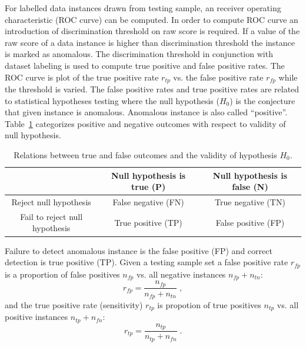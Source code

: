 For labelled data instances drawn from testing sample, an receiver operating characteristic 
(ROC curve) can be computed. 
In order to compute ROC curve an introduction of discrimination threshold on raw score 
is required. If a value of the raw score of a data instance is higher than discrimination 
threshold the instance is marked as anomalous. The discrimination threshold in conjunction 
with dataset labeling is used to compute true positive and false positive rates.
The ROC curve is plot of the true positive rate $r_{tp}$ vs. the false positive rate $r_{fp}$ 
while the threshold is varied.
The false positive rates and true positive rates are related to statistical hypotheses testing
where the null hypothesis ($H_0$) is the conjecture that given instance is anomalous.
Anomalous instance is also called ``positive''. Table~\ref{tbl:hypo} categorizes positive and
negative outcomes  with respect to validity of null hypothesis.

\begin{table}[h]
    \begin{center}
        \begin{tabular}{c|cc}
        	& Null hypothesis is true (P)	& Null hypothesis is false (N) \\ \hline
        	Reject null hypothesis & False negative (FN) & True negative (TN) \\
        	Fail to reject null hypothesis & True positive (TP) & False positive (FP) \\ %
        \end{tabular}
    \end{center}
    \caption{\small Relations between true and false outcomes and the validity of hypothesis $H_0$.}
    \label{tbl:hypo}
\end{table}



Failure to detect anomalous instance is the false positive (FP) and correct detection is true positive (TP).
Given a testing sample set a false positive rate $r_{fp}$ is a proportion of false positives $n_{fp}$ vs.
all negative instances $n_{fp} + n_{tn}$:
\begin{equation}
	r_{fp} = \frac{n_{fp}}{n_{fp}+n_{tn}} \;,
\end{equation}
and the true positive rate (sensitivity) $r_{tp}$ is propotion of true positives $n_{tp}$ 
vs. all positive instances $n_{tp} + n_{fn}$:
\begin{equation}
	r_{tp} = \frac{n_{tp}}{n_{tp}+n_{fn}} \;.
\end{equation}

